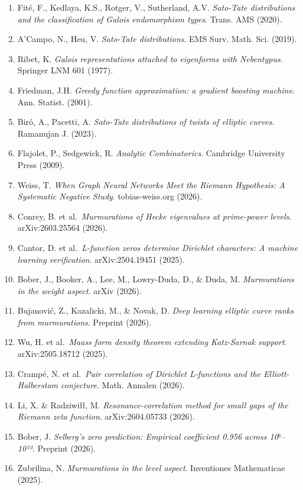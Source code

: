 \documentclass[
]{article}
\begin{document}
\begin{enumerate}
  Modular Forms'', Springer (2014).
\item
  Fité, F., Kedlaya, K.S., Rotger, V., Sutherland, A.V. \emph{Sato-Tate
  distributions and the classification of Galois endomorphism types}.
  Trans. AMS (2020).
\item
  A'Campo, N., Heu, V. \emph{Sato-Tate distributions}. EMS Surv. Math.
  Sci. (2019).
\item
  Ribet, K. \emph{Galois representations attached to eigenforms with
  Nebentypus}. Springer LNM 601 (1977).
\item
  Friedman, J.H. \emph{Greedy function approximation: a gradient
  boosting machine}. Ann. Statist. (2001).
\item
  Biró, A., Pacetti, A. \emph{Sato-Tate distributions of twists of
  elliptic curves}. Ramanujan J. (2023).
\item
  Flajolet, P., Sedgewick, R. \emph{Analytic Combinatorics}. Cambridge
  University Press (2009).
\item
  Weiss, T. \emph{When Graph Neural Networks Meet the Riemann
  Hypothesis: A Systematic Negative Study}. tobias-weiss.org (2026).
\item
  Conrey, B. et al.~\emph{Murmurations of Hecke eigenvalues at
  prime-power levels}. arXiv:2603.25564 (2026).
\item
  Cantor, D. et al.~\emph{L-function zeros determine Dirichlet
  characters: A machine learning verification}. arXiv:2504.19451 (2025).
\item
  Bober, J., Booker, A., Lee, M., Lowry-Duda, D., \& Duda, M.
  \emph{Murmurations in the weight aspect}. arXiv (2026).
\item
  Bujanović, Z., Kazalicki, M., \& Novak, D. \emph{Deep learning
  elliptic curve ranks from murmurations}. Preprint (2026).
\item
  Wu, H. et al.~\emph{Maass form density theorem extending Katz-Sarnak
  support}. arXiv:2505.18712 (2025).
\item
  Crampé, N. et al.~\emph{Pair correlation of Dirichlet L-functions and
  the Elliott-Halberstam conjecture}. Math. Annalen (2026).
\item
  Li, X. \& Radziwiłł, M. \emph{Resonance-correlation method for small
  gaps of the Riemann zeta function}. arXiv:2604.05733 (2026).
\item
  Bober, J. \emph{Selberg's zero prediction: Empirical coefficient 0.956
  across 10⁶--10²²}. Preprint (2026).
\item
  Zubrilina, N. \emph{Murmurations in the level aspect}. Inventiones
  Mathematicae (2025).
\end{enumerate}
\end{document}
